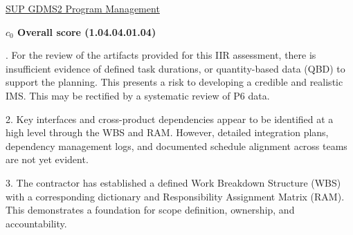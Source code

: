 % 


\begin{frame}{\href{run:../local/source-docs/1.04.04.01.04.pdf}{SUP GDMS2 Program Management}}
\centering
{}
\par
\vspace{0.75em}
\textbf{\small{\(c_0\) Overall score {\tiny (1.04.04.01.04)}}}\\\par
\vspace{0.5em}
\begin{minipage}{0.85\textwidth}
\raggedright
\fontsize{7}{9}. For the review of the artifacts provided for this IIR assessment, there is insufficient evidence of defined task durations, or quantity-based data (QBD) to support the planning. This presents a risk to developing a credible and realistic IMS. This may be rectified by a systematic review of P6 data.\par\vspace{0.5em}2. Key interfaces and cross-product dependencies appear to be identified at a high level through the WBS and RAM. However, detailed integration plans, dependency management logs, and documented schedule alignment across teams are not yet evident.\par\vspace{0.5em}3. The contractor has established a defined Work Breakdown Structure (WBS) with a corresponding dictionary and Responsibility Assignment Matrix (RAM). This demonstrates a foundation for scope definition, ownership, and accountability.\par
\end{minipage}
\end{frame}
